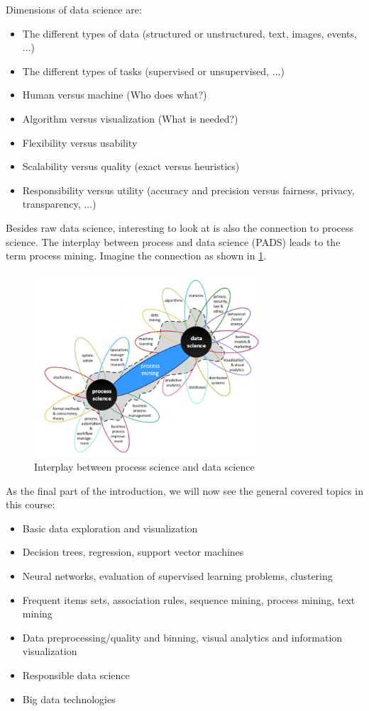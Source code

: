 Dimensions of data science are:
\begin{itemize}
  \item The different types of data (structured or unstructured, text, images, events, $\dots$)
  \item The different types of tasks (supervised or unsupervised, $\dots$)
  \item Human versus machine (Who does what?)
  \item Algorithm versus visualization (What is needed?)
  \item Flexibility versus usability
  \item Scalability versus quality (exact versus heuristics)
  \item Responsibility versus utility (accuracy and precision versus fairness, privacy, transparency, $\dots$)
\end{itemize}

Besides raw data science, interesting to look at is also the connection to process science. The interplay between process and data science (PADS) leads to the term process mining. Imagine the connection as shown in \ref{fig:0_pads}.

\begin{figure}[H]
  \centering
  \includegraphics[width=0.75\textwidth]{assets/intro/pads.png} 
  \caption{Interplay between process science and data science}
  \label{fig:0_pads}
\end{figure}

As the final part of the introduction, we will now see the general covered topics in this course:
\begin{itemize}
  \item Basic data exploration and visualization
  \item Decision trees, regression, support vector machines
  \item Neural networks, evaluation of supervised learning problems, clustering
  \item Frequent items sets, association rules, sequence mining, process mining, text mining
  \item Data preprocessing/quality and binning, visual analytics and information visualization
  \item Responsible data science
  \item Big data technologies
\end{itemize}

